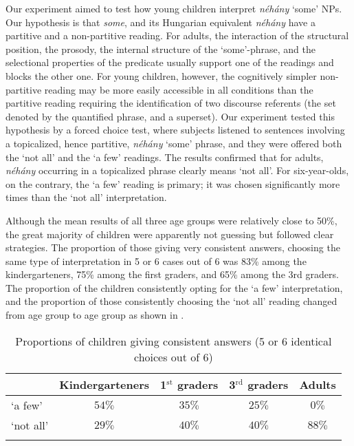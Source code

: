 \documentclass[output=paper]{langscibook}
\begin{document}
Our experiment aimed to test how young children interpret \textit{néhány} `some' NPs. Our hypothesis is that \textit{some}, and its Hungarian equivalent \textit{néhány} have a partitive and a non-partitive reading. For adults, the interaction of the structural position, the prosody, the internal structure of the `some'-phrase, and the selectional properties of the predicate usually support one of the readings and blocks the other one. For young children, however, the cognitively simpler non-partitive reading may be more easily accessible in all conditions than the partitive reading requiring the identification of two discourse referents (the set denoted by the quantified phrase, and a superset).	Our experiment tested this hypothesis by a forced choice test, where subjects listened to sentences involving a topicalized, hence partitive, \textit{néhány} `some' phrase, and they were offered both the `not all' and the `a few' readings. The results confirmed that for adults, \textit{néhány} occurring in a topicalized phrase clearly means `not all'. For six-year-olds, on the contrary, the `a few' reading is primary; it was chosen significantly more times than the `not all' interpretation. 

Although the mean results of all three age groups were relatively close to 50\%, the great majority of children were apparently not guessing but followed clear strategies. The proportion of those giving very consistent answers, choosing the same type of interpretation in 5 or 6 cases out of 6 was 83\% among the kindergarteners, 75\% among the first graders, and 65\% among the 3rd graders. The proportion of the children consistently opting for the `a few' interpretation, and the proportion of those consistently choosing the `not all' reading changed from age group to age group as shown in .

\begin{table}
\begin{tabular}{l c c c c} 
\lsptoprule
 {} & Kindergarteners & 1$^\text{st}$ graders & 3$^\text{rd}$ graders & Adults \\
\midrule
`a few' & $54\%$ & $35\%$ & $25\%$ & $0\%$ \\
`not all' & $29\%$ & $40\%$ & $40\%$ & $88\%$ \\
\lspbottomrule
\end{tabular}
\caption{Proportions of children giving consistent answers (5 or 6 identical choices out of 6)}
\label{kis-zet:table:1}
\end{table}
\end{document}
